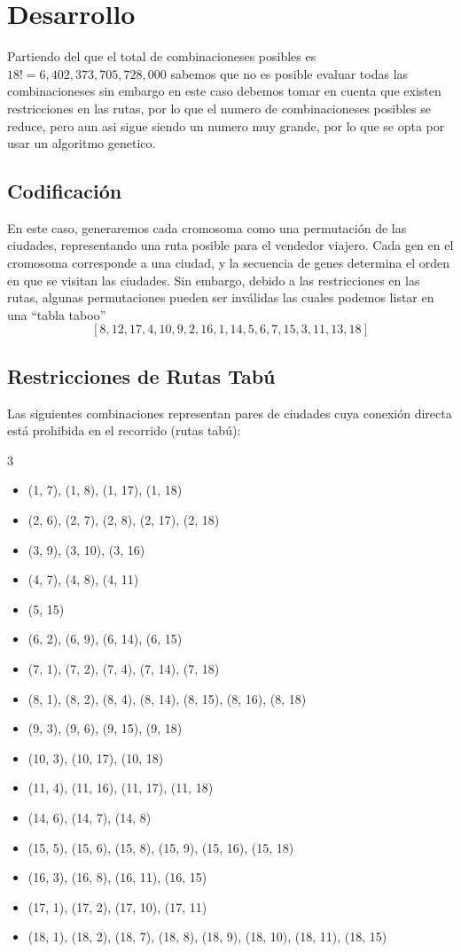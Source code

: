 \section{Desarrollo}
Partiendo del que el total de combinacioneses posibles es $18! = 6,402,373,705,728,000$ sabemos que no es posible evaluar todas las combinacioneses
sin embargo en este caso debemos tomar en cuenta que existen restricciones en las rutas, por lo que el numero de combinacioneses posibles se reduce, 
pero aun asi sigue siendo un numero muy grande, por lo que se opta por usar un algoritmo genetico.

\subsection{Codificación}
En este caso, generaremos cada cromosoma como una permutación de las ciudades, representando una ruta posible para el vendedor viajero.
Cada gen en el cromosoma corresponde a una ciudad, y la secuencia de genes determina el orden en que se visitan las ciudades. Sin embargo,
debido a las restricciones en las rutas, algunas permutaciones pueden ser inválidas las cuales podemos listar en una ``tabla taboo''
\[
[8, 12, 17, 4, 10, 9, 2, 16, 1, 14, 5, 6, 7, 15, 3, 11, 13, 18]
\]
\subsection{Restricciones de Rutas Tabú}

Las siguientes combinaciones representan pares de ciudades cuya conexión directa está prohibida en el recorrido (rutas tabú):

\begin{multicols}{3}
\begin{itemize}\label{Lista taboo}
    \item (1, 7), (1, 8), (1, 17), (1, 18)
    \item (2, 6), (2, 7), (2, 8), (2, 17), (2, 18)
    \item (3, 9), (3, 10), (3, 16)
    \item (4, 7), (4, 8), (4, 11)
    \item (5, 15)
    \item (6, 2), (6, 9), (6, 14), (6, 15)
    \item (7, 1), (7, 2), (7, 4), (7, 14), (7, 18)
    \item (8, 1), (8, 2), (8, 4), (8, 14), (8, 15), (8, 16), (8, 18)
    \item (9, 3), (9, 6), (9, 15), (9, 18)
    \item (10, 3), (10, 17), (10, 18)
    \item (11, 4), (11, 16), (11, 17), (11, 18)
    \item (14, 6), (14, 7), (14, 8)
    \item (15, 5), (15, 6), (15, 8), (15, 9), (15, 16), (15, 18)
    \item (16, 3), (16, 8), (16, 11), (16, 15)
    \item (17, 1), (17, 2), (17, 10), (17, 11)
    \item (18, 1), (18, 2), (18, 7), (18, 8), (18, 9), (18, 10), (18, 11), (18, 15)
\end{itemize}
\end{multicols}

